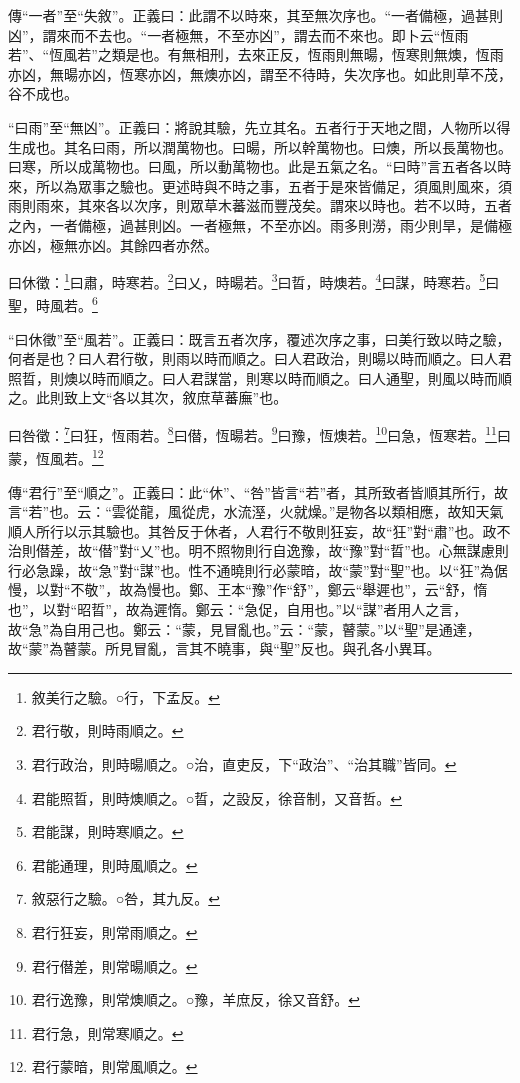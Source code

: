 {\noindent\zhuan{}\fzbyks 傳“一者”至“失敘”。正義曰：此謂不以時來，其至無次序也。“一者備極，過甚則凶”，謂來而不去也。“一者極無，不至亦凶”，謂去而不來也。即卜云“恆雨若”、“恆風若”之類是也。有無相刑，去來正反，恆雨則無暘，恆寒則無燠，恆雨亦凶，無暘亦凶，恆寒亦凶，無燠亦凶，謂至不待時，失次序也。如此則草不茂，谷不成也。 \par}

{\noindent\shu{}\fzkt “曰雨”至“無凶”。正義曰：將說其驗，先立其名。五者行于天地之間，人物所以得生成也。其名曰雨，所以潤萬物也。曰暘，所以幹萬物也。曰燠，所以長萬物也。曰寒，所以成萬物也。曰風，所以動萬物也。此是五氣之名。“曰時”言五者各以時來，所以為眾事之驗也。更述時與不時之事，五者于是來皆備足，須風則風來，須雨則雨來，其來各以次序，則眾草木蕃滋而豐茂矣。謂來以時也。若不以時，五者之內，一者備極，過甚則凶。一者極無，不至亦凶。雨多則澇，雨少則旱，是備極亦凶，極無亦凶。其餘四者亦然。 \par}

曰休徵：\footnote{敘美行之驗。○行，下孟反。}曰肅，時寒若。\footnote{君行敬，則時雨順之。}曰乂，時暘若。\footnote{君行政治，則時暘順之。○治，直吏反，下“政治”、“治其職”皆同。}曰晢，時燠若。\footnote{君能照晢，則時燠順之。○晢，之設反，徐音制，又音哲。}曰謀，時寒若。\footnote{君能謀，則時寒順之。}曰聖，時風若。\footnote{君能通理，則時風順之。}

{\noindent\shu{}\fzkt “曰休徵”至“風若”。正義曰：既言五者次序，覆述次序之事，曰美行致以時之驗，何者是也？曰人君行敬，則雨以時而順之。曰人君政治，則暘以時而順之。曰人君照晢，則燠以時而順之。曰人君謀當，則寒以時而順之。曰人通聖，則風以時而順之。此則致上文“各以其次，敘庶草蕃廡”也。 \par}

曰咎徵：\footnote{敘惡行之驗。○咎，其九反。}曰狂，恆雨若。\footnote{君行狂妄，則常雨順之。}曰僣，恆暘若。\footnote{君行僣差，則常暘順之。}曰豫，恆燠若。\footnote{君行逸豫，則常燠順之。○豫，羊庶反，徐又音舒。}曰急，恆寒若。\footnote{君行急，則常寒順之。}曰蒙，恆風若。\footnote{君行蒙暗，則常風順之。}

{\noindent\zhuan{}\fzbyks 傳“君行”至“順之”。正義曰：此“休”、“咎”皆言“若”者，其所致者皆順其所行，故言“若”也。云：“雲從龍，風從虎，水流溼，火就燥。”是物各以類相應，故知天氣順人所行以示其驗也。其咎反于休者，人君行不敬則狂妄，故“狂”對“肅”也。政不治則僣差，故“僣”對“乂”也。明不照物則行自逸豫，故“豫”對“晢”也。心無謀慮則行必急躁，故“急”對“謀”也。性不通曉則行必蒙暗，故“蒙”對“聖”也。以“狂”為倨慢，以對“不敬”，故為慢也。鄭、王本“豫”作“舒”，鄭云“舉遲也”，云“舒，惰也”，以對“昭晢”，故為遲惰。鄭云：“急促，自用也。”以“謀”者用人之言，故“急”為自用己也。鄭云：“蒙，見冒亂也。”云：“蒙，瞽蒙。”以“聖”是通達，故“蒙”為瞽蒙。所見冒亂，言其不曉事，與“聖”反也。與孔各小異耳。 \par}

